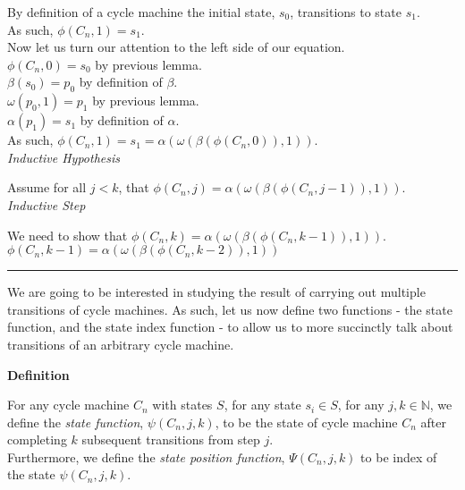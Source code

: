 \documentclass[a4paper,12pt]{article}
\begin{document}
\noindent By definition of a cycle machine the initial state, $s_0$, transitions to state $s_1$.\\

\noindent As such, $\phi(C_n, 1) = s_1$.\\

\noindent Now let us turn our attention to the left side of our equation.\\

\noindent $\phi(C_n, 0) = s_0$ by previous lemma.\\

\noindent $\beta(s_0) = p_0$ by definition of $\beta$.\\

\noindent $\omega(p_0, 1) = p_1$ by previous lemma.\\

\noindent $\alpha(p_1) = s_1$ by definition of $\alpha$.\\

\noindent As such, $\phi(C_n, 1) = s_1 = \alpha(\omega(\beta(\phi(C_n, 0)), 1))$.\\


\noindent
\textit{Inductive Hypothesis}

\noindent Assume for all $j < k$, that $\phi(C_n, j) = \alpha(\omega(\beta(\phi(C_n, j - 1)), 1))$.\\


\noindent
\textit{Inductive Step}

\noindent We need to show that $\phi(C_n, k) = \alpha(\omega(\beta(\phi(C_n, k - 1)), 1))$.\\

\noindent $\phi(C_n, k - 1) = \alpha(\omega(\beta(\phi(C_n, k - 2)), 1))$



\noindent 
\begin{center}
\noindent\rule{8cm}{0.4pt}
\end{center}





\noindent We are going to be interested in studying the result of carrying out multiple transitions of cycle machines. As such, let us now define two functions - the state function, and the state index function - to allow us to more succinctly talk about transitions of an arbitrary cycle machine.\\



\label{definition:state_function}
\hypertarget{definition:state_function}{}
\begin{tcolorbox}
\textbf{Definition}

\noindent For any cycle machine $C_n$ with states $S$, for any state $s_i \in S$, for any $j, k \in \mathbb{N}$, we define the \textit{state function}, $\psi(C_n, j, k)$, to be the state of cycle machine $C_n$ after completing $k$ subsequent transitions from step $j$.\\

\noindent Furthermore, we define the \textit{state position function}, $\Psi(C_n, j, k)$ to be index of the state $\psi(C_n, j, k)$.
\end{tcolorbox}
\noindent
\end{document}
